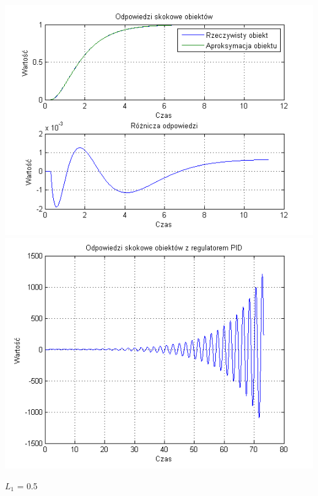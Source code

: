 \documentclass[10pt,a4paper]{article}
\begin{document}
\begin{center}
\includegraphics[scale=1]{images/dwa/skrypt_161.png}\\
\includegraphics[scale=1]{images/dwa/skrypt_162.png}\\
\end{center}
\newpage
$L_1$ = 0.5
\end{document}

